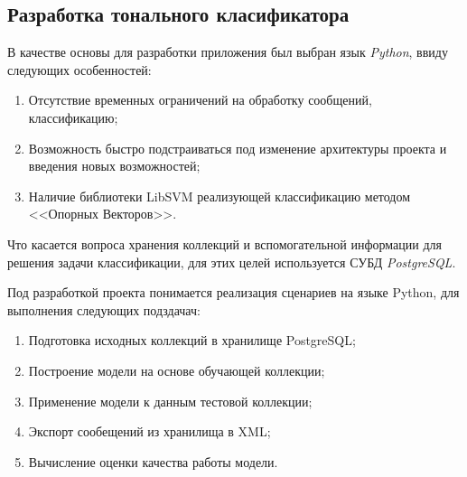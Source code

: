     \subsection{Разработка тонального класификатора}
        В качестве основы для разработки приложения был выбран язык {\it Python},
        ввиду следующих особенностей:
        \begin{enumerate}
            \item Отсутствие временных ограничений на обработку сообщений,
                классификацию;
            \item Возможность быстро подстраиваться под изменение архитектуры
                проекта и введения новых возможностей;
            \item Наличие библиотеки LibSVM \cite{svmClassifier} реализующей
                классификацию методом <<Опорных Векторов>>.
        \end{enumerate}

        Что касается вопроса хранения коллекций и вспомогательной информации
        для решения задачи классификации, для этих целей используется СУБД
        {\it PostgreSQL}.

        Под разработкой проекта понимается реализация сценариев на языке Python,
        для выполнения следующих подздачач:
        \begin{enumerate}
            \item Подготовка исходных коллекций в хранилище PostgreSQL;
            \item Построение модели на основе обучающей коллекции;
            \item Применение модели к данным тестовой коллекции;
            \item Экспорт сообещений из хранилища в XML;
            \item Вычисление оценки качества работы модели.
        \end{enumerate}

